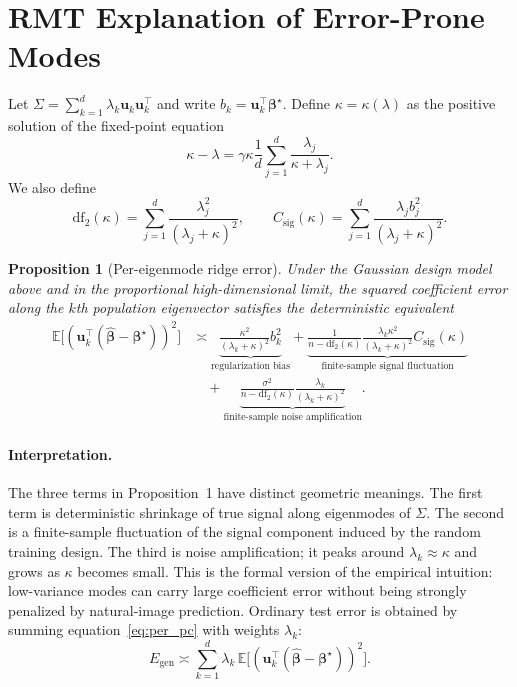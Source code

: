 \documentclass{article}
\newtheorem{proposition}{Proposition}
\newcommand{\bhat}{\widehat{\boldsymbol{\beta}}}
\newcommand{\btrue}{\boldsymbol{\beta}^{\star}}
\newcommand{\uhat}{\mathbf{u}}
\newcommand{\df}{\mathrm{df}_{2}}
\begin{document}
\section{RMT Explanation of Error-Prone Modes}

Let $\Sigma=\sum_{k=1}^{d}\lambda_k \uhat_k\uhat_k^\top$ and write $b_k=\uhat_k^\top\btrue$. Define $\kappa=\kappa(\lambda)$ as the positive solution of the fixed-point equation
\begin{equation}
    \kappa-\lambda
    = \gamma\kappa \frac{1}{d}\sum_{j=1}^{d}\frac{\lambda_j}{\kappa+\lambda_j}.
    \label{eq:kappa}
\end{equation}
We also define
\begin{equation}
    \df(\kappa)=\sum_{j=1}^{d}\frac{\lambda_j^2}{(\lambda_j+\kappa)^2},
    \qquad
    C_{\mathrm{sig}}(\kappa)=\sum_{j=1}^{d}\frac{\lambda_j b_j^2}{(\lambda_j+\kappa)^2}.
\end{equation}

\begin{proposition}[Per-eigenmode ridge error]
Under the Gaussian design model above and in the proportional high-dimensional limit, the squared coefficient error along the $k$th population eigenvector satisfies the deterministic equivalent
\begin{align}
    \mathbb{E}\bigl[(\uhat_k^\top(\bhat-\btrue))^2\bigr]
    &\asymp
    \underbrace{\frac{\kappa^2}{(\lambda_k+\kappa)^2}b_k^2}_{\text{regularization bias}}
    +
    \underbrace{
    \frac{1}{n-\df(\kappa)}
    \frac{\lambda_k\kappa^2}{(\lambda_k+\kappa)^2}
    C_{\mathrm{sig}}(\kappa)}_{\text{finite-sample signal fluctuation}}
    \nonumber\\
    &\quad+
    \underbrace{
    \frac{\sigma^2}{n-\df(\kappa)}
    \frac{\lambda_k}{(\lambda_k+\kappa)^2}}_{\text{finite-sample noise amplification}} .
    \label{eq:per_pc}
\end{align}
\end{proposition}

\paragraph{Interpretation.}
The three terms in Proposition~1 have distinct geometric meanings. The first term is deterministic shrinkage of true signal along eigenmodes of $\Sigma$. The second is a finite-sample fluctuation of the signal component induced by the random training design. The third is noise amplification; it peaks around $\lambda_k\approx\kappa$ and grows as $\kappa$ becomes small. This is the formal version of the empirical intuition: low-variance modes can carry large coefficient error without being strongly penalized by natural-image prediction. Ordinary test error is obtained by summing equation~\ref{eq:per_pc} with weights $\lambda_k$:
\begin{equation}
    E_{\mathrm{gen}}\asymp
    \sum_{k=1}^{d}\lambda_k\,
    \mathbb{E}\bigl[(\uhat_k^\top(\bhat-\btrue))^2\bigr].
\end{equation}
\end{document}
